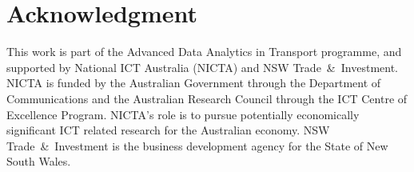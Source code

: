 \section*{Acknowledgment}

%
This work is part of the Advanced Data Analytics in Transport programme, and
supported by National ICT Australia (NICTA) and NSW Trade~\&~Investment. NICTA is
funded by the Australian Government through the Department of Communications and
the Australian Research Council through the ICT Centre of Excellence Program.
NICTA's role is to pursue potentially economically significant ICT related
research for the Australian economy. NSW Trade~\&~Investment is the business
development agency for the State of New South Wales.
